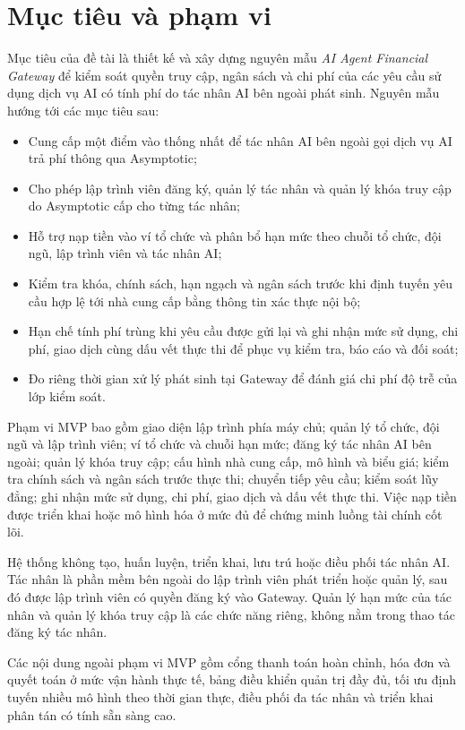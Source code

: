 \section{Mục tiêu và phạm vi}

Mục tiêu của đề tài là thiết kế và xây dựng nguyên mẫu \textit{AI Agent Financial Gateway} để kiểm soát quyền truy cập, ngân sách và chi phí của các yêu cầu sử dụng dịch vụ AI có tính phí do tác nhân AI bên ngoài phát sinh. Nguyên mẫu hướng tới các mục tiêu sau:

\begin{itemize}
    \item Cung cấp một điểm vào thống nhất để tác nhân AI bên ngoài gọi dịch vụ AI trả phí thông qua Asymptotic;
    \item Cho phép lập trình viên đăng ký, quản lý tác nhân và quản lý khóa truy cập do Asymptotic cấp cho từng tác nhân;
    \item Hỗ trợ nạp tiền vào ví tổ chức và phân bổ hạn mức theo chuỗi tổ chức, đội ngũ, lập trình viên và tác nhân AI;
    \item Kiểm tra khóa, chính sách, hạn ngạch và ngân sách trước khi định tuyến yêu cầu hợp lệ tới nhà cung cấp bằng thông tin xác thực nội bộ;
    \item Hạn chế tính phí trùng khi yêu cầu được gửi lại và ghi nhận mức sử dụng, chi phí, giao dịch cùng dấu vết thực thi để phục vụ kiểm tra, báo cáo và đối soát;
    \item Đo riêng thời gian xử lý phát sinh tại Gateway để đánh giá chi phí độ trễ của lớp kiểm soát.
\end{itemize}

Phạm vi MVP bao gồm giao diện lập trình phía máy chủ; quản lý tổ chức, đội ngũ và lập trình viên; ví tổ chức và chuỗi hạn mức; đăng ký tác nhân AI bên ngoài; quản lý khóa truy cập; cấu hình nhà cung cấp, mô hình và biểu giá; kiểm tra chính sách và ngân sách trước thực thi; chuyển tiếp yêu cầu; kiểm soát lũy đẳng; ghi nhận mức sử dụng, chi phí, giao dịch và dấu vết thực thi. Việc nạp tiền được triển khai hoặc mô hình hóa ở mức đủ để chứng minh luồng tài chính cốt lõi.

Hệ thống không tạo, huấn luyện, triển khai, lưu trú hoặc điều phối tác nhân AI. Tác nhân là phần mềm bên ngoài do lập trình viên phát triển hoặc quản lý, sau đó được lập trình viên có quyền đăng ký vào Gateway. Quản lý hạn mức của tác nhân và quản lý khóa truy cập là các chức năng riêng, không nằm trong thao tác đăng ký tác nhân.

Các nội dung ngoài phạm vi MVP gồm cổng thanh toán hoàn chỉnh, hóa đơn và quyết toán ở mức vận hành thực tế, bảng điều khiển quản trị đầy đủ, tối ưu định tuyến nhiều mô hình theo thời gian thực, điều phối đa tác nhân và triển khai phân tán có tính sẵn sàng cao.

